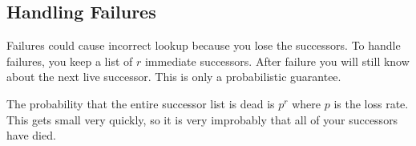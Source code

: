 \documentclass[psamsfonts]{amsart}
\begin{document}
\subsection{Handling Failures}

Failures could cause incorrect lookup because you lose the successors. To handle failures, you keep a list of $r$ immediate successors. After failure you will still know about the next live successor. This is only a probabilistic guarantee.

The probability that the entire successor list is dead is $p^r$ where $p$ is the loss rate. This gets small very quickly, so it is very improbably that all of your successors have died.
\end{document}
